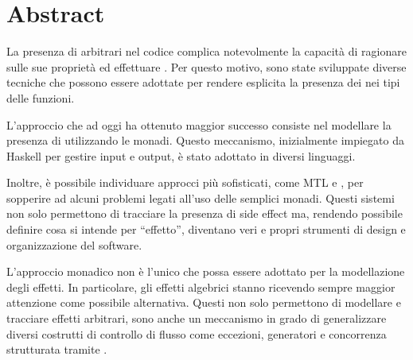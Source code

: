 \chapter*{Abstract}

La presenza di  arbitrari nel codice complica notevolmente la capacità di ragionare sulle sue proprietà ed effettuare .
Per questo motivo, sono state sviluppate diverse tecniche che possono essere adottate per rendere esplicita la presenza dei  nei tipi delle funzioni.

L'approccio che ad oggi ha ottenuto maggior successo consiste nel modellare la presenza di  utilizzando le monadi.
Questo meccanismo, inizialmente impiegato da Haskell per gestire input e output, è stato adottato in diversi linguaggi.

Inoltre, è possibile individuare approcci più sofisticati, come MTL e , per sopperire ad alcuni problemi legati all'uso delle semplici monadi.
Questi sistemi non solo permettono di tracciare la presenza di side effect ma, rendendo possibile definire cosa si intende per ``effetto'', diventano veri e propri strumenti di design e organizzazione del software.

L'approccio monadico non è l'unico che possa essere adottato per la modellazione degli effetti. In particolare, gli effetti algebrici stanno ricevendo sempre maggior attenzione come possibile alternativa.
Questi non solo permettono di modellare e tracciare effetti arbitrari, sono anche un meccanismo in grado di generalizzare diversi costrutti di controllo di flusso come eccezioni, generatori e concorrenza strutturata tramite .